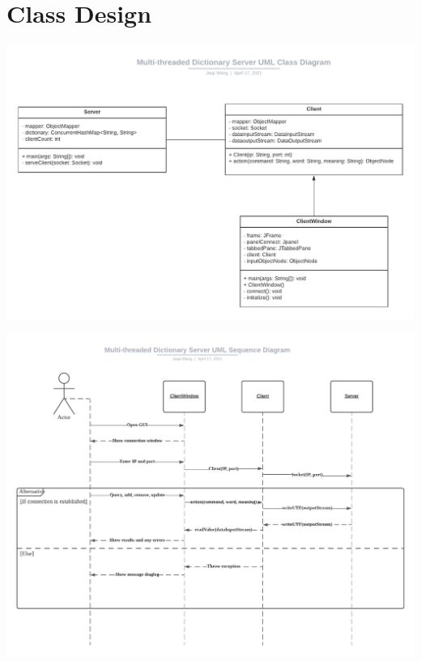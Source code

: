 \documentclass[12pt]{article}
\begin{document}
\newpage
\section{Class Design}
\includegraphics[scale=0.65]{Multi-threaded Dictionary Server UML Class Diagram}

\includegraphics[scale=0.6]{Multi-threaded Dictionary Server UML Sequence Diagram}
\newpage
\end{document}
